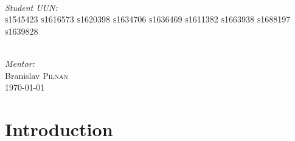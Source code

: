 \documentclass[12pt]{article}
\begin{document}
\begin{titlepage}
\begin{minipage}{0.45\textwidth}
\begin{flushleft}
\end{flushleft}
\end{minipage}
~
\begin{minipage}{0.25\textwidth}
\begin{flushright} \large
\emph{Student UUN:} \\
\textsc{s1545423} 
\textsc{s1616573}
\textsc{s1620398}
\textsc{s1634706}
\textsc{s1636469}
\textsc{s1611382}
\textsc{s1663938}
\textsc{s1688197}
\textsc{s1639828}
\end{flushright}
\end{minipage}\\[1.5cm]


\Large \emph{Mentor:}\\
Branislav \textsc{Pilnan}\\[1cm] 


{\large
\today
}\\[2cm] 

 

\vfill %

\end{titlepage}

\section*{Introduction}
\end{document}

